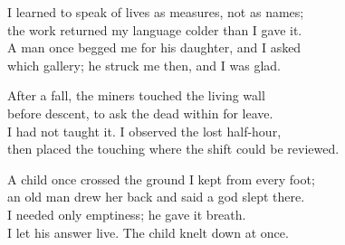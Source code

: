 \begin{founder}
I learned to speak of lives as measures, not as names;\\
the work returned my language colder than I gave it.\\
A man once begged me for his daughter, and I asked\\
which gallery; he struck me then, and I was glad.\\
\medskip

After a fall, the miners touched the living wall\\
before descent, to ask the dead within for leave.\\
I had not taught it. I observed the lost half-hour,\\
then placed the touching where the shift could be reviewed.\\
\medskip

A child once crossed the ground I kept from every foot;\\
an old man drew her back and said a god slept there.\\
I needed only emptiness; he gave it breath.\\
I let his answer live. The child knelt down at once.\\

\ornament


\end{founder}
